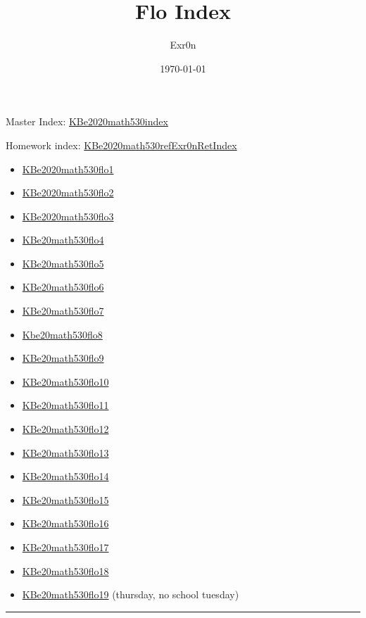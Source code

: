 \documentclass[letterpaper]{article}
\author{Exr0n}
\date{\today}
\title{Flo Index}
\renewcommand{\tableofcontents}{}
\begin{document}
\tableofcontents

Master Index: \href{KBe2020math530index.org}{KBe2020math530index}

Homework index:
\href{KBe2020math530refExr0nRetIndex.org}{KBe2020math530refExr0nRetIndex}

\begin{itemize}
\item \href{KBe2020math530flo1.org}{KBe2020math530flo1}
\item \href{KBe2020math530flo2.org}{KBe2020math530flo2}
\item \href{KBe2020math530flo3.org}{KBe2020math530flo3}
\item \href{KBe20math530flo4.org}{KBe20math530flo4}
\item \href{KBe20math530flo5.org}{KBe20math530flo5}
\item \href{KBe20math530flo6.org}{KBe20math530flo6}
\item \href{KBe20math530flo7.org}{KBe20math530flo7}
\item \href{Kbe20math530flo8.org}{Kbe20math530flo8}
\item \href{KBe20math530flo9.org}{KBe20math530flo9}
\item \href{KBe20math530flo10.org}{KBe20math530flo10}
\item \href{KBe20math530flo11.org}{KBe20math530flo11}
\item \href{KBe20math530flo12.org}{KBe20math530flo12}
\item \href{KBe20math530flo13.org}{KBe20math530flo13}
\item \href{KBe20math530flo14.org}{KBe20math530flo14}
\item \href{KBe20math530flo15.org}{KBe20math530flo15}
\item \href{KBe20math530flo16.org}{KBe20math530flo16}
\item \href{KBe20math530flo17.org}{KBe20math530flo17}
\item \href{KBe20math530flo18.org}{KBe20math530flo18}
\item \href{KBe20math530flo19.org}{KBe20math530flo19} (thursday, no school
tuesday)
\end{itemize}

\noindent\rule{\textwidth}{0.5pt}
\end{document}
